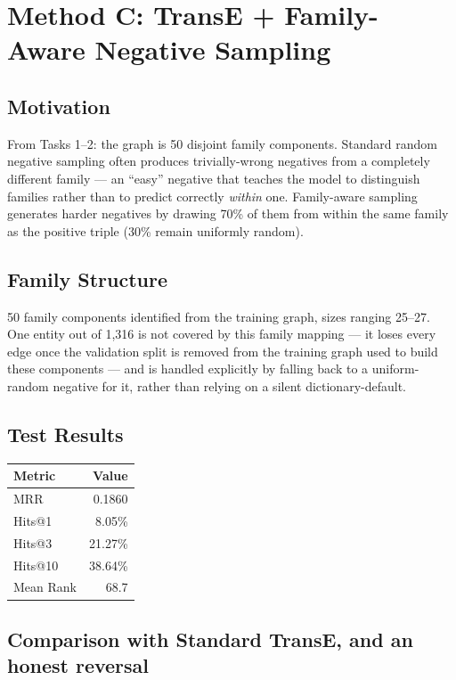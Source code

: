 \documentclass[11pt,a4paper]{article}
\begin{document}
\section{Method C: TransE + Family-Aware Negative Sampling}

\subsection{Motivation}

From Tasks 1--2: the graph is 50 disjoint family components. Standard
random negative sampling often produces trivially-wrong negatives from a
completely different family --- an ``easy'' negative that teaches the
model to distinguish families rather than to predict correctly
\emph{within} one. Family-aware sampling generates harder negatives by
drawing 70\% of them from within the same family as the positive triple
(30\% remain uniformly random).

\subsection{Family Structure}

50 family components identified from the training graph, sizes ranging
25--27. One entity out of 1{,}316 is not covered by this family mapping
--- it loses every edge once the validation split is removed from the
training graph used to build these components --- and is handled
explicitly by falling back to a uniform-random negative for it, rather
than relying on a silent dictionary-default.

\subsection{Test Results}

\begin{center}
\begin{tabular}{lr}
\toprule
\textbf{Metric} & \textbf{Value} \\
\midrule
MRR & 0.1860 \\
Hits@1 & 8.05\% \\
Hits@3 & 21.27\% \\
Hits@10 & 38.64\% \\
Mean Rank & 68.7 \\
\bottomrule
\end{tabular}
\end{center}

\subsection{Comparison with Standard TransE, and an honest reversal}
\end{document}
